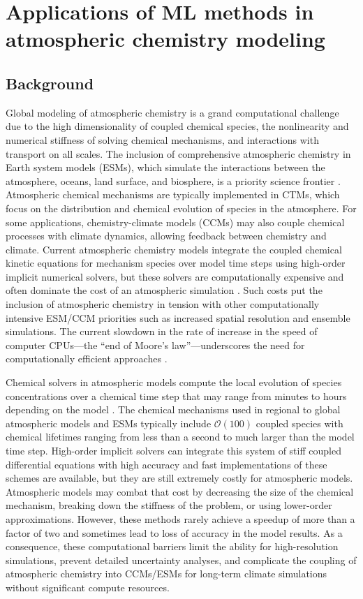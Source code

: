 \documentclass[gmd, manuscript]{copernicus}
\begin{document}
\section{Applications of ML methods in atmospheric chemistry modeling}
\subsection{Background}
Global modeling of atmospheric chemistry is a grand computational challenge due to the high dimensionality of coupled chemical species, the nonlinearity and numerical stiffness of solving chemical mechanisms, and interactions with transport on all scales. The inclusion of comprehensive atmospheric chemistry in Earth system models (ESMs), which simulate the interactions between the atmosphere, oceans, land surface, and biosphere, is a priority science frontier \citep{national_research_council_national_2012}. Atmospheric chemical mechanisms are typically implemented in CTMs, which focus on the distribution and chemical evolution of species in the atmosphere. For some applications, chemistry-climate models (CCMs) may also couple chemical processes with climate dynamics, allowing feedback between chemistry and climate. Current atmospheric chemistry models integrate the coupled chemical kinetic equations for mechanism species over model time steps using high-order implicit numerical solvers, but these solvers are computationally expensive \citep{sandu_benchmarking_1997} and often dominate the cost of an atmospheric simulation \citep{eastham_geos-chem_2018}. Such costs put the inclusion of atmospheric chemistry in tension with other computationally intensive ESM/CCM priorities such as increased spatial resolution and ensemble simulations. The current slowdown in the rate of increase in the speed of computer CPUs—the “end of Moore's law”—underscores the need for computationally efficient approaches \citep{theis_end_2017}.
 
Chemical solvers in atmospheric models compute the local evolution of species concentrations over a chemical time step that may range from minutes to hours depending on the model \citep{brasseur_modeling_2017}. The chemical mechanisms used in regional to global atmospheric models and ESMs typically include $\mathcal{O}(100)$ coupled species with chemical lifetimes ranging from less than a second to much larger than the model time step. High-order implicit solvers can integrate this system of stiff coupled differential equations with high accuracy and fast implementations of these schemes are available, but they are still extremely costly for atmospheric models. Atmospheric models may combat that cost by decreasing the size of the chemical mechanism, breaking down the stiffness of the problem, or using lower-order approximations. However, these methods rarely achieve a speedup of more than a factor of two \citep{lin_adaptive_2023, shen_adaptive_2020} and sometimes lead to loss of accuracy in the model results. As a consequence, these computational barriers limit the ability for high-resolution simulations, prevent detailed uncertainty analyses, and complicate the coupling of atmospheric chemistry into CCMs/ESMs for long-term climate simulations without significant compute resources. 
 
\end{document}

